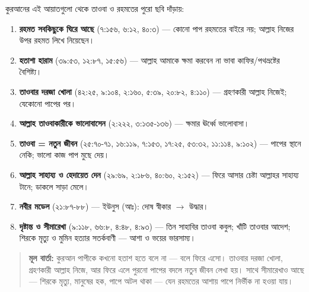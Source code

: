 কুরআনের এই আয়াতগুলো থেকে তাওবা ও রহমতের পুরো ছবি দাঁড়ায়:

\begin{enumerate}
\item \textbf{রহমত সবকিছুকে ঘিরে আছে} (৭:১৫৬, ৬:১২, ৪০:৩) — কোনো পাপ রহমতের বাইরে নয়; আল্লাহ নিজের উপর রহমত লিখে নিয়েছেন।
\item \textbf{হতাশা হারাম} (৩৯:৫৩, ১২:৮৭, ১৫:৫৬) — আল্লাহ আমাকে ক্ষমা করবেন না ভাবা কাফির/পথভ্রষ্টের বৈশিষ্ট্য।
\item \textbf{তাওবার দরজা খোলা} (৪২:২৫, ৯:১০৪, ২:১৬০, ৫:৩৯, ২০:৮২, ৪:১১০) — গ্রহণকারী আল্লাহ নিজেই; যেকোনো পাপের পর।
\item \textbf{আল্লাহ তাওবাকারীকে ভালোবাসেন} (২:২২২, ৩:১৩৫-১৩৬) — ক্ষমার ঊর্ধ্বে ভালোবাসা।
\item \textbf{তাওবা = নতুন জীবন} (২৫:৭০-৭১, ১৬:১১৯, ৭:১৫৩, ১৭:২৫, ৫৩:৩২, ১১:১১৪, ৯:১০২) — পাপের স্থানে নেকি; ভালো কাজ পাপ মুছে দেয়।
\item \textbf{আল্লাহ সাহায্য ও হেদায়েত দেন} (২৯:৬৯, ২:১৮৬, ৪০:৬০, ২:১৫২) — ফিরে আসার চেষ্টা আল্লাহর সাহায্য টানে; ডাকলে সাড়া মেলে।
\item \textbf{নবীর মডেল} (২১:৮৭-৮৮) — ইউনুস (আঃ): দোষ স্বীকার $\rightarrow$ উদ্ধার।
\item \textbf{দৃষ্টান্ত ও সীমারেখা} (৯:১১৮, ৬৬:৮, ৪:৪৮, ৪:৯৩) — তিন সাহাবির তাওবা কবুল; খাঁটি তাওবার আদেশ; শিরকে মৃত্যু ও মুমিন হত্যার সতর্কবাণী — আশা ও ভয়ের ভারসাম্য।
\end{enumerate}
\begin{quote}
\textbf{মূল বার্তা:} কুরআন পাপীকে কখনো হতাশ হতে বলে না — বলে ফিরে এসো। তাওবার দরজা খোলা, গ্রহণকারী আল্লাহ নিজে, আর ফিরে এলে পুরনো পাপের বদলে নতুন জীবন লেখা হয়। সাথে সীমারেখাও আছে — শিরকে মৃত্যু, মানুষের হক, পাপে অটল থাকা — যেন রহমতের আশায় পাপে নির্ভীক না হওয়া যায়।
\end{quote}



